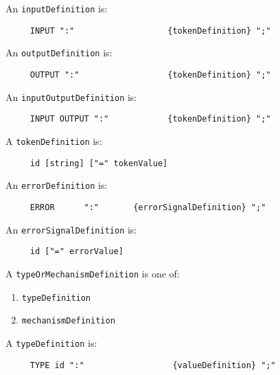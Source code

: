 An {\tt inputDefinition} is:
\begin{tscreen}
\begin{verbatim}
     INPUT ":"                   {tokenDefinition} ";"
\end{verbatim}
\end{tscreen}


An {\tt outputDefinition} is:
\begin{tscreen}
\begin{verbatim}
     OUTPUT ":"                  {tokenDefinition} ";"
\end{verbatim}
\end{tscreen}


An {\tt inputOutputDefinition} is:
\begin{tscreen}
\begin{verbatim}
     INPUT OUTPUT ":"            {tokenDefinition} ";"
\end{verbatim}
\end{tscreen}


A {\tt tokenDefinition} is:
\begin{tscreen}
\begin{verbatim}
     id [string] ["=" tokenValue]
\end{verbatim}
\end{tscreen}


An {\tt errorDefinition} is:
\begin{tscreen}
\begin{verbatim}
     ERROR      ":"       {errorSignalDefinition} ";"
\end{verbatim}
\end{tscreen}


An {\tt errorSignalDefinition} is:
\begin{tscreen}
\begin{verbatim}
     id ["=" errorValue]
\end{verbatim}
\end{tscreen}


A {\tt typeOrMechanismDefinition} is one of:
\begin{enumerate}
\item {\tt typeDefinition}
\item {\tt mechanismDefinition}
\end{enumerate}


A {\tt typeDefinition} is:
\begin{tscreen}
\begin{verbatim}
     TYPE id ":"                  {valueDefinition} ";"
\end{verbatim}
\end{tscreen}


